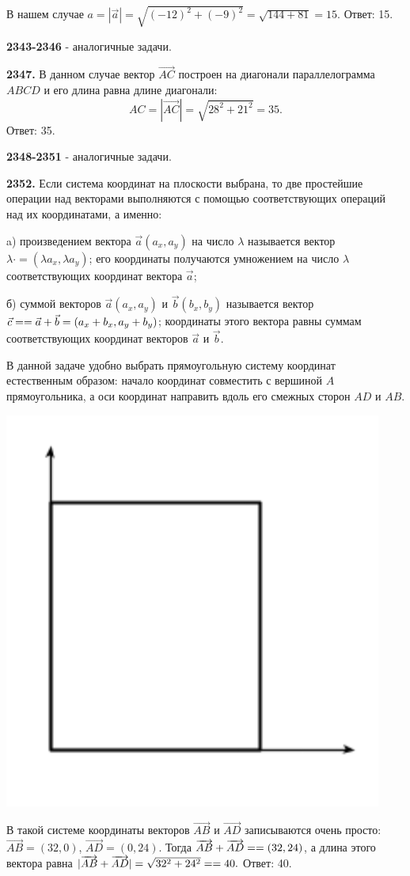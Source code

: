 В нашем случае $a = |\vec{a}|=\sqrt{(-12)^2+(-9)^2}=\sqrt{144+81}=15.$ \newline \null \hspace*{\fill} Ответ: 15.

\textbf{2343-2346} - аналогичные задачи.

\textbf{2347.} В данном случае вектор $\overrightarrow{AC}$ построен на диагонали параллелограмма $ABCD$ и его длина равна длине диагонали:
\[
AC=|\overrightarrow{AC}|=\sqrt{28^2+21^2}=35.
\]\null \hspace*{\fill} Ответ: 35.

\textbf{2348-2351} - аналогичные задачи.

\textbf{2352.} Если система координат на плоскости выбрана, то две простейшие операции над векторами выполняются с помощью соответствующих операций над их координатами, а именно:

a) произведением вектора $\vec{a}(a_x, a_y)$ на число $\lambda$ называется вектор $\lambda \cdot = (\lambda a_x, \lambda a_y)$; его координаты получаются умножением на число $\lambda$ соответствующих координат вектора $\vec{a}$;

б) суммой векторов $\vec{a}(a_x, a_y)$ и $\vec{b}(b_x, b_y)$ называется вектор $\vec{c}=\linebreak=\vec{a}+\vec{b}=(a_x+b_x, a_y+b_y)$; координаты этого вектора равны суммам соответствующих координат векторов $\vec{a}$ и $\vec{b}$. 

В данной задаче удобно выбрать прямоугольную систему координат естественным образом: начало координат совместить с вершиной $A$ прямоугольника, а оси координат направить вдоль его смежных сторон $AD$ и $AB$.

{\centering \includegraphics[width=0.4\linewidth]{Geometry/Content/55.png}
	
}

В такой системе  координаты векторов $\overrightarrow{AB}$ и $\overrightarrow{AD}$ записываются очень просто: $\overrightarrow{AB} = (32, 0)$, $\overrightarrow{AD} = (0, 24)$. Тогда $\overrightarrow{AB} + \overrightarrow{AD} = \linebreak =(32, 24)$, а длина этого вектора равна $|\overrightarrow{AB} + \overrightarrow{AD}| = \sqrt{32^2+24^2}=\linebreak=40.$ \newline \null \hspace*{\fill} Ответ: 40.

